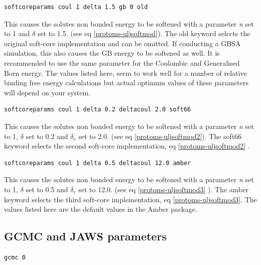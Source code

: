 \documentclass[letterpaper,10pt,english]{sphinxmanual}
\begin{document}
\begin{Verbatim}[frame=single,commandchars=\\\{\}]
softcoreparams coul 1 delta 1.5 gb 0 old
\end{Verbatim}

This causes the solutes non bonded energy to be softened with a parameter \emph{n} set to 1 and \(\delta\) set to 1.5. (see eq \eqref{protoms-uljsoftmod}). The old keyword selects the original soft-core implementation and can be omitted. If conducting a GBSA simulation, this also causes the GB energy to be softened as well. It is recommended to use the same parameter for the Coulombic and Generalised Born energy. The values listed here, seem to work well for a number of relative binding free energy calculations but actual optimum values of these parameters will depend on your system.

\begin{Verbatim}[frame=single,commandchars=\\\{\}]
softcoreparams coul 1 delta 0.2 deltacoul 2.0 soft66
\end{Verbatim}

This causes the solutes non bonded energy to be softened with a parameter \emph{n} set to 1, \(\delta\) set to 0.2 and \(\delta_c\) set to 2.0. (see eq \eqref{protoms-uljsoftmod2}). The soft66 keyword selects the second soft-core implementation, eq \eqref{protoms-uljsoftmod2} .

\begin{Verbatim}[frame=single,commandchars=\\\{\}]
softcoreparams coul 1 delta 0.5 deltacoul 12.0 amber
\end{Verbatim}

This causes the solutes non bonded energy to be softened with a parameter \emph{n} set to 1, \(\delta\) set to 0.5 and \(\delta_c\)  set to 12.0. (see eq \eqref{protoms-uljsoftmod3} ). The amber keyword selects the third soft-core implementation, eq \eqref{protoms-uljsoftmod3}. The values listed here are the default values in the Amber package.


\subsection{GCMC and JAWS parameters}
\label{protoms:gcmc-and-jaws-parameters}
\begin{Verbatim}[frame=single,commandchars=\\\{\}]
gcmc 0
\end{Verbatim}
\end{document}
